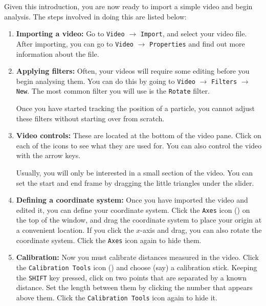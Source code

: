 Given this introduction, you are now ready to import a simple video and begin analysis. The steps involved in doing this are listed below:
\begin{enumerate}
    \item \textbf{Importing a video: } Go to \texttt{Video} $\rightarrow$ \texttt{Import}, and select your video file. After importing, you can go to \texttt{Video} $\rightarrow$ \texttt{Properties} and find out more information about the file.
    
    \item \textbf{Applying filters: } Often, your videos will require some editing before you begin analysing them. You can do this by going to \texttt{Video} $\rightarrow$ \texttt{Filters} $\rightarrow$ \texttt{New}. The most common filter you will use is the \texttt{Rotate} filter.
    
    \begin{tip}
    Once you have started tracking the position of a particle, you cannot adjust these filters without starting over from scratch.
    \end{tip}

    \item \textbf{Video controls: } These are located at the bottom of the video pane. Click on each of the icons to see what they are used for. You can also control the video with the arrow keys.
    
    \begin{tip}
    Usually, you will only be interested in a small section of the video. You can set the start and end frame by dragging the little triangles under the slider.
    \end{tip}
    
    
    \item \textbf{Defining a coordinate system: }  Once you have imported the video and edited it, you can define your coordinate system. Click the \texttt{Axes} icon () on the top of the window, and drag the coordinate system to place your origin at a convenient location. If you click the $x$-axis and drag, you can also rotate the coordinate system. Click the \texttt{Axes} icon again to hide them.
    
    \item \textbf{Calibration: } Now you must calibrate distances measured in the video. Click the \texttt{Calibration Tools} icon () and choose (say) a calibration stick. Keeping the \texttt{SHIFT} key pressed, click on two points that are separated by a known distance. Set the length between them by clicking the number that appears above them. Click the \texttt{Calibration Tools} icon again to hide it. 
    

\end{enumerate}

